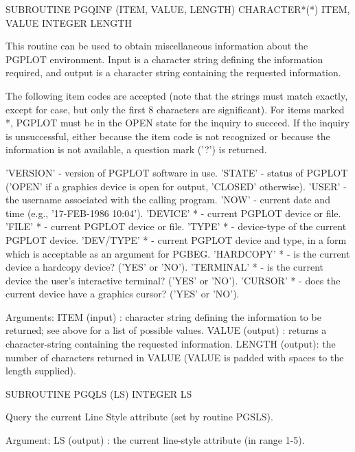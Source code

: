 {\eightpoint\begintt
      SUBROUTINE PGQINF (ITEM, VALUE, LENGTH)
      CHARACTER*(*) ITEM, VALUE
      INTEGER LENGTH
 
This routine can be used to obtain miscellaneous information about
the PGPLOT environment. Input is a character string defining the
information required, and output is a character string containing the
requested information.
 
The following item codes are accepted (note that the strings must
match exactly, except for case, but only the first 8 characters are
significant). For items marked *, PGPLOT must be in the OPEN state
for the inquiry to succeed. If the inquiry is unsuccessful, either
because the item code is not recognized or because the information
is not available, a question mark ('?') is returned.
 
  'VERSION'     - version of PGPLOT software in use.
  'STATE'       - status of PGPLOT ('OPEN' if a graphics device
                  is open for output, 'CLOSED' otherwise).
  'USER'        - the username associated with the calling program.
  'NOW'         - current date and time (e.g., '17-FEB-1986 10:04').
  'DEVICE'    * - current PGPLOT device or file.
  'FILE'      * - current PGPLOT device or file.
  'TYPE'      * - device-type of the current PGPLOT device.
  'DEV/TYPE'  * - current PGPLOT device and type, in a form which
                  is acceptable as an argument for PGBEG.
  'HARDCOPY'  * - is the current device a hardcopy device? ('YES' or
                  'NO').
  'TERMINAL'  * - is the current device the user's interactive
                  terminal? ('YES' or 'NO').
  'CURSOR'    * - does the current device have a graphics cursor?
                  ('YES' or 'NO').
 
Arguments:
 ITEM  (input)  : character string defining the information to
                  be returned; see above for a list of possible
                  values.
 VALUE (output) : returns a character-string containing the
                  requested information.
 LENGTH (output): the number of characters returned in VALUE
                  (VALUE is padded with spaces to the length
                  supplied).
\endtt}

{\eightpoint\begintt
      SUBROUTINE PGQLS (LS)
      INTEGER  LS
 
Query the current Line Style attribute (set by routine PGSLS).
 
Argument:
 LS     (output) : the current line-style attribute (in range 1-5).
\endtt}

